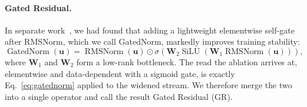 \paragraph{Gated Residual.}
\label{sec:residual-gr}
In separate work~\citep{qiu2026unified}, we had found that adding a lightweight elementwise self-gate
after RMSNorm, which we call GatedNorm, markedly improves training stability:
\begin{equation}
\operatorname{GatedNorm}(\bm{u}) = \operatorname{RMSNorm}(\bm{u})\odot
\sigma\left(\bm{W}_{2}\operatorname{SiLU}\left(\bm{W}_{1}
\operatorname{RMSNorm}(\bm{u})\right)\right),
\label{eq:gatednorm}
\end{equation}
where $\bm{W}_1$ and $\bm{W}_2$ form a low-rank bottleneck.
The read the ablation arrives at, elementwise and data-dependent with a
sigmoid gate, is exactly Eq.~\eqref{eq:gatednorm} applied to the widened
stream. We therefore merge the two into a single operator and call the result
Gated Residual (GR).

